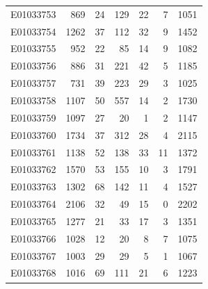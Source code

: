 \documentclass[
  letterpaper,
  DIV=11,
  numbers=noendperiod]{scrreprt}
\begin{document}
\begin{tabular}{lrrrrrr}
E01033753     &     869 &      24 &                   129 &                              22 &                       7 &              1051 \\
E01033754     &    1262 &      37 &                   112 &                              32 &                       9 &              1452 \\
E01033755     &     952 &      22 &                    85 &                              14 &                       9 &              1082 \\
E01033756     &     886 &      31 &                   221 &                              42 &                       5 &              1185 \\
E01033757     &     731 &      39 &                   223 &                              29 &                       3 &              1025 \\
E01033758     &    1107 &      50 &                   557 &                              14 &                       2 &              1730 \\
E01033759     &    1097 &      27 &                    20 &                               1 &                       2 &              1147 \\
E01033760     &    1734 &      37 &                   312 &                              28 &                       4 &              2115 \\
E01033761     &    1138 &      52 &                   138 &                              33 &                      11 &              1372 \\
E01033762     &    1570 &      53 &                   155 &                              10 &                       3 &              1791 \\
E01033763     &    1302 &      68 &                   142 &                              11 &                       4 &              1527 \\
E01033764     &    2106 &      32 &                    49 &                              15 &                       0 &              2202 \\
E01033765     &    1277 &      21 &                    33 &                              17 &                       3 &              1351 \\
E01033766     &    1028 &      12 &                    20 &                               8 &                       7 &              1075 \\
E01033767     &    1003 &      29 &                    29 &                               5 &                       1 &              1067 \\
E01033768     &    1016 &      69 &                   111 &                              21 &                       6 &              1223 \\
\bottomrule
\end{tabular}
\end{document}
